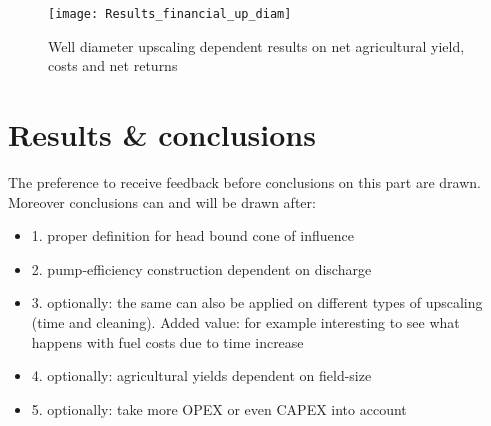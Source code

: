 \begin{figure}[h!]
 \centering
 \texttt{[image: Results\_financial\_up\_diam]}
 \captionsetup{justification=centering} 
 \caption{Well diameter upscaling dependent results on net agricultural yield, costs and net returns}
 \label{fig:Results_financial_up_diam}
\end{figure}

\section{Results \& conclusions}
\label{section:Yields_conclusions}

The preference to receive feedback before conclusions on this part are drawn. Moreover conclusions can and will be drawn after: 
\begin{itemize}
\item{1.} proper definition for head bound cone of influence 
\item{2.} pump-efficiency construction dependent on discharge 
\item{3.} optionally: the same can also be applied on different types of upscaling (time and cleaning). Added value: for example interesting to see what happens with fuel costs due to time increase
\item{4.} optionally: agricultural yields dependent on field-size 
\item{5.} optionally: take more OPEX or even CAPEX into account 
\end{itemize}